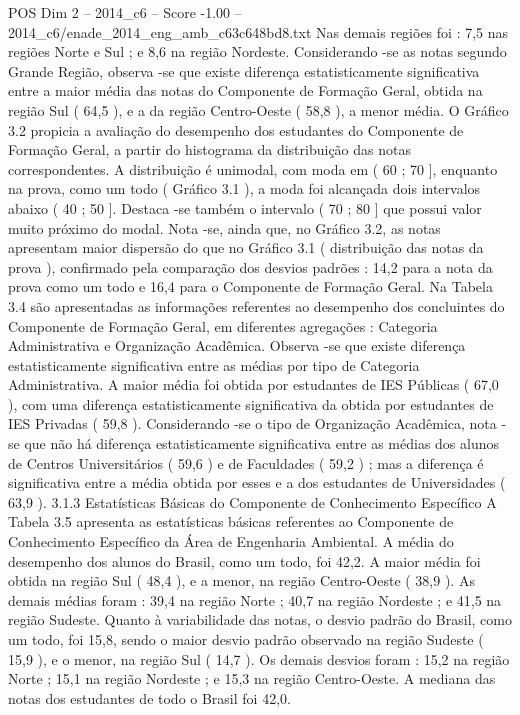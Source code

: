 \begin{textsample}{POS Dim 2 – 2014\_c6 – Score -1.00 – 2014\_c6/enade\_2014\_eng\_amb\_c63c648bd8.txt}
Nas demais regiões foi : 7,5 nas regiões Norte e Sul ; e 8,6 na região Nordeste.
Considerando -se as notas segundo Grande Região, observa -se que existe diferença estatisticamente significativa entre a maior média das notas do Componente de Formação Geral, obtida na região Sul ( 64,5 ), e a da região Centro-Oeste ( 58,8 ), a menor média.
O Gráfico 3.2 propicia a avaliação do desempenho dos estudantes do Componente de Formação Geral, a partir do histograma da distribuição das notas correspondentes.
A distribuição é unimodal, com moda em ( 60 ; 70 ], enquanto na prova, como um todo ( Gráfico 3.1 ), a moda foi alcançada dois intervalos abaixo ( 40 ; 50 ].
Destaca -se também o intervalo ( 70 ; 80 ] que possui valor muito próximo do modal.
Nota -se, ainda que, no Gráfico 3.2, as notas apresentam maior dispersão do que no Gráfico 3.1 ( distribuição das notas da prova ), confirmado pela comparação dos desvios padrões : 14,2 para a nota da prova como um todo e 16,4 para o Componente de Formação Geral.
Na Tabela 3.4 são apresentadas as informações referentes ao desempenho dos concluintes do Componente de Formação Geral, em diferentes agregações : Categoria Administrativa e Organização Acadêmica.
Observa -se que existe diferença estatisticamente significativa entre as médias por tipo de Categoria Administrativa.
A maior média foi obtida por estudantes de IES Públicas ( 67,0 ), com uma diferença estatisticamente significativa da obtida por estudantes de IES Privadas ( 59,8 ).
Considerando -se o tipo de Organização Acadêmica, nota -se que não há diferença estatisticamente significativa entre as médias dos alunos de Centros Universitários ( 59,6 ) e de Faculdades ( 59,2 ) ; mas a diferença é significativa entre a média obtida por esses e a dos estudantes de Universidades ( 63,9 ). 3.1.3 Estatísticas Básicas do Componente de Conhecimento Específico A Tabela 3.5 apresenta as estatísticas básicas referentes ao Componente de Conhecimento Específico da Área de Engenharia Ambiental.
A média do desempenho dos alunos do Brasil, como um todo, foi 42,2.
A maior média foi obtida na região Sul ( 48,4 ), e a menor, na região Centro-Oeste ( 38,9 ).
As demais médias foram : 39,4 na região Norte ; 40,7 na região Nordeste ; e 41,5 na região Sudeste.
Quanto à variabilidade das notas, o desvio padrão do Brasil, como um todo, foi 15,8, sendo o maior desvio padrão observado na região Sudeste ( 15,9 ), e o menor, na região Sul ( 14,7 ).
Os demais desvios foram : 15,2 na região Norte ; 15,1 na região Nordeste ; e 15,3 na região Centro-Oeste.
A mediana das notas dos estudantes de todo o Brasil foi 42,0.

\end{textsample}
